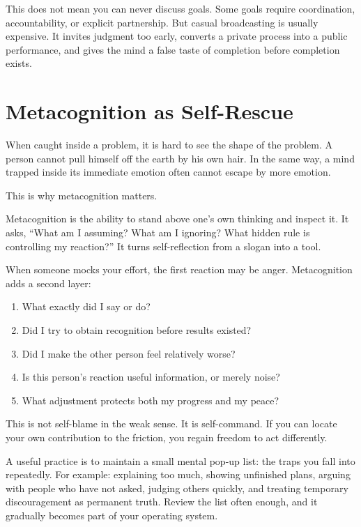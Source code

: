 This does not mean you can never discuss goals. Some goals require coordination, accountability, or explicit partnership. But casual broadcasting is usually expensive. It invites judgment too early, converts a private process into a public performance, and gives the mind a false taste of completion before completion exists.

\section*{Metacognition as Self-Rescue}

When caught inside a problem, it is hard to see the shape of the problem. A person cannot pull himself off the earth by his own hair. In the same way, a mind trapped inside its immediate emotion often cannot escape by more emotion.

This is why metacognition matters.

Metacognition is the ability to stand above one's own thinking and inspect it. It asks, ``What am I assuming? What am I ignoring? What hidden rule is controlling my reaction?'' It turns self-reflection from a slogan into a tool.

When someone mocks your effort, the first reaction may be anger. Metacognition adds a second layer:

\begin{enumerate}
\item What exactly did I say or do?
\item Did I try to obtain recognition before results existed?
\item Did I make the other person feel relatively worse?
\item Is this person's reaction useful information, or merely noise?
\item What adjustment protects both my progress and my peace?
\end{enumerate}

This is not self-blame in the weak sense. It is self-command. If you can locate your own contribution to the friction, you regain freedom to act differently.

A useful practice is to maintain a small mental pop-up list: the traps you fall into repeatedly. For example: explaining too much, showing unfinished plans, arguing with people who have not asked, judging others quickly, and treating temporary discouragement as permanent truth. Review the list often enough, and it gradually becomes part of your operating system.

